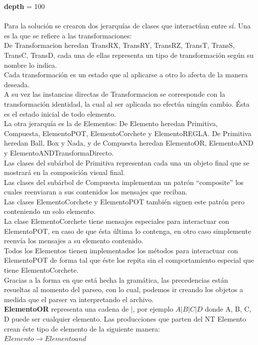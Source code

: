 \documentclass[10pt,a4paper]{article}
\begin{document}
\textbf{depth} = 100\\
\\
 Para la solución se crearon dos jerarquías de clases que interactúan entre sí. Una es la que se refiere a las transformaciones:\\
De Transformacion heredan TransRX, TransRY, TransRZ, TransT, TransS, TransC, TransD, cada una de ellas representa un tipo de transformación según su nombre lo indica.\\
Cada transformación es un estado que al aplicarse a otro lo afecta de la manera deseada.\\
A su vez las instancias directas de Transformacion se corresponde con la transformación identidad, la cual al ser aplicada no efectúa ningún cambio. Ésta es el estado inicial de todo elemento.\\
La otra jerarquía es la de Elementos:
De Elemento heredan Primitiva, Compuesta, ElementoPOT, ElementoCorchete y ElementoREGLA. De Primitiva heredan Ball, Box y Nada, y de Compuesta heredan ElementoOR, ElementoAND y  ElementoANDTransformaDirecto.\\
Las clases del subárbol de Primitiva representan cada una un objeto final que se mostrará en la composición visual final.\\
Las clases del subárbol de Compuesta implementan un patrón ``composite'' los cuales reenviaran a sus contenidos los mensajes que reciban.\\
Las clases ElementoCorchete y ElementoPOT también siguen este patrón pero conteniendo un solo elemento.\\
La clase ElementoCorchete tiene mensajes especiales para interactuar con ElementoPOT, en caso de que ésta última lo contenga, en otro caso simplemente reenvía los mensajes a su elemento contenido.\\
Todos los Elementos tienen implementados los métodos para interactuar con ElementoPOT de forma tal que éste los repita sin el comportamiento especial que tiene ElementoCorchete.\\
Gracias a la forma en que está hecha la gramática, las precedencias están resueltas al momento del parseo, con lo cual, podemos ir creando los objetos a medida que el parser va interpretando el archivo.\\
\textbf{ElementoOR} representa una cadena de $|$, por ejemplo $A|B|C|D$ donde A, B, C, D puede ser cualquier elemento.
Las producciones que parten del NT Elemento crean éste tipo de elemento de la siguiente manera:\\
$Elemento\rightarrow{}Elementoand$\\
\end{document}
